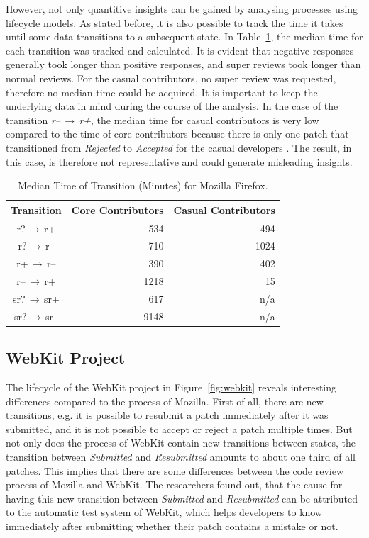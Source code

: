 \documentclass[conference]{IEEEtran}
\begin{document}
However, not only quantitive insights can be gained by analysing processes using lifecycle models. As stated before, it is also possible to track the time it takes until some data transitions to a subsequent state. In Table~\ref{tab:mozilla}, the median time for each transition was tracked and calculated. It is evident that negative responses generally took longer than positive responses, and super reviews took longer than normal reviews. For the casual contributors, no super review was requested, therefore no median time could be acquired. It is important to keep the underlying data in mind during the course of the analysis. In the case of the transition \textit{r--$\,\to\,$r+}, the median time for casual contributors is very low compared to the time of core contributors because there is only one patch that transitioned from \textit{Rejected} to \textit{Accepted} for the casual developers \cite{baysal2015synthesizing}. The result, in this case, is therefore not representative and could generate misleading insights.

\begin{table}[htbp]
\caption{Median Time of Transition (Minutes) for Mozilla Firefox\cite{baysal2015synthesizing}.}
\begin{center}
\begin{tabular}{|c|r|r|}
\hline
\textbf{Transition} & \textbf{Core Contributors} & \textbf{Casual Contributors} \\
\hline
r?$\,\to\,$r+ & 534 & 494 \\
\hline
r?$\,\to\,$r-- & 710 & 1024 \\
\hline
r+$\,\to\,$r-- & 390 & 402 \\
\hline
r--$\,\to\,$r+ & 1218 & 15 \\
\hline
sr?$\,\to\,$sr+ & 617 & n/a \\
\hline
sr?$\,\to\,$sr-- & 9148 & n/a \\
\hline
\end{tabular}
\label{tab:mozilla}
\end{center}
\end{table}

\subsection{WebKit Project}

The lifecycle of the WebKit project in Figure~\ref{fig:webkit} reveals interesting differences compared to the process of Mozilla. First of all, there are new transitions, e.g. it is possible to resubmit a patch immediately after it was submitted, and it is not possible to accept or reject a patch multiple times. But not only does the process of WebKit contain new transitions between states, the transition between \textit{Submitted} and \textit{Resubmitted} amounts to about one third of all patches. This implies that there are some differences between the code review process of Mozilla and WebKit. The researchers found out, that the cause for having this new transition between \textit{Submitted} and \textit{Resubmitted} can be attributed to the automatic test system of WebKit, which helps developers to know immediately after submitting whether their patch contains a mistake or not\cite{baysal2015synthesizing}.
\end{document}
